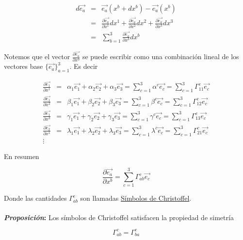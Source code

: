 \documentclass[12pt]{report}
\begin{document}
\begin{eqnarray} \nonumber
d\vec{e_a} &=& \vec{e_a}(x^b+dx^b)- \vec{e_a}(x^b) \\ \nonumber
&=&\frac{\partial \vec{e_a}}{\partial x^1}dx^1 +
\frac{\partial \vec{e_a}}{\partial x^2}dx^2 +
\frac{\partial \vec{e_a}}{\partial x^3}dx^3 \\ \label{2.76}
&=& \displaystyle \sum_{b=1}^3 \frac{\partial \vec{e_a}}{\partial x^b}dx^b
\end{eqnarray}



Notemos que el vector $\displaystyle\frac{\partial \vec{e_a}}{\partial x^b}$
se puede escribir como una combinación lineal de los vectores base $\{ \vec{e_a} \}_{a=1}^3$. Es decir

\begin{eqnarray} \nonumber
\frac{\partial \vec{e_1}}{\partial x^1} &=& \alpha_1 \vec{e_1}+ \alpha_2 \vec{e_2} + \alpha_3 \vec{e_3}= \displaystyle\sum_{c=1}^3  \alpha^c \vec{e_c}=\sum_{c=1}^3 \Gamma_{11}^c \vec{e_c} \\ \nonumber
\frac{\partial \vec{e_1}}{\partial x^2} &=& \beta_1 \vec{e_1}+ \beta_2 \vec{e_2} + \beta_3 \vec{e_3}= \displaystyle\sum_{c=1}^3  \beta^c \vec{e_c}=\sum_{c=1}^3 \Gamma_{12}^c \vec{e_c} \\ \nonumber
\frac{\partial \vec{e_1}}{\partial x^3} &=& \gamma_1 \vec{e_1}+ \gamma_2 \vec{e_2} + \gamma_3 \vec{e_3}= \displaystyle\sum_{c=1}^3  \gamma^c \vec{e_c}=\sum_{c=1}^3 \Gamma_{13}^c \vec{e_c} \\ \nonumber
\frac{\partial \vec{e_2}}{\partial x^1} &=& \lambda_1 \vec{e_1}+ \lambda_2 \vec{e_2} + \lambda_3 \vec{e_3}= \displaystyle\sum_{c=1}^3  \lambda^c \vec{e_c}=\sum_{c=1}^3 \Gamma_{21}^c \vec{e_c} \\ \nonumber
 \vdots
 \end{eqnarray}

En resumen 


\begin{equation} \label{2.77}
\frac{\partial \vec{e_a}}{\partial x^b} = \displaystyle\sum_{c=1}^3 \Gamma_{ab}^c \vec{e_c}
\end{equation}

Donde las cantidades $\Gamma_{ab}^c$ son llamadas \underline{Símbolos de Christoffel}. \\
\\
\textbf{\textit{Proposición}:} Los símbolos de Christoffel satisfacen la propiedad de simetría 

\begin{equation} \label{2.78}
\Gamma_{ab}^c = \Gamma_{ba}^c
\end{equation}
\end{document}
